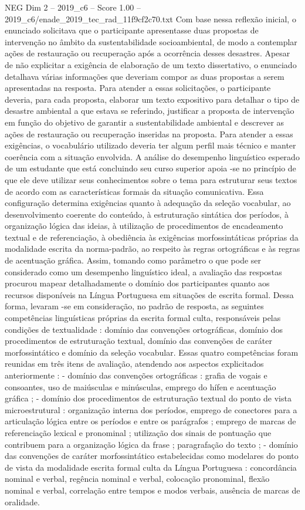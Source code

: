 \begin{textsample}{NEG Dim 2 – 2019\_c6 – Score 1.00 – 2019\_c6/enade\_2019\_tec\_rad\_11f9cf2c70.txt}
Com base nessa reflexão inicial, o enunciado solicitava que o participante apresentasse duas propostas de intervenção no âmbito da sustentabilidade socioambiental, de modo a contemplar ações de restauração ou recuperação após a ocorrência desses desastres.
Apesar de não explicitar a exigência de elaboração de um texto dissertativo, o enunciado detalhava várias informações que deveriam compor as duas propostas a serem apresentadas na resposta.
Para atender a essas solicitações, o participante deveria, para cada proposta, elaborar um texto expositivo para detalhar o tipo de desastre ambiental a que estava se referindo, justificar a proposta de intervenção em função do objetivo de garantir a sustentabilidade ambiental e descrever as ações de restauração ou recuperação inseridas na proposta.
Para atender a essas exigências, o vocabulário utilizado deveria ter algum perfil mais técnico e manter coerência com a situação envolvida.
A análise do desempenho linguístico esperado de um estudante que está concluindo seu curso superior apoia -se no princípio de que ele deve utilizar seus conhecimentos sobre o tema para estruturar seus textos de acordo com as características formais da situação comunicativa.
Essa configuração determina exigências quanto à adequação da seleção vocabular, ao desenvolvimento coerente do conteúdo, à estruturação sintática dos períodos, à organização lógica das ideias, à utilização de procedimentos de encadeamento textual e de referenciação, à obediência às exigências morfossintáticas próprias da modalidade escrita da norma-padrão, ao respeito às regras ortográficas e às regras de acentuação gráfica.
Assim, tomando como parâmetro o que pode ser considerado como um desempenho linguístico ideal, a avaliação das respostas procurou mapear detalhadamente o domínio dos participantes quanto aos recursos disponíveis na Língua Portuguesa em situações de escrita formal.
Dessa forma, levaram -se em consideração, no padrão de resposta, as seguintes competências linguísticas próprias da escrita formal culta, responsáveis pelas condições de textualidade : domínio das convenções ortográficas, domínio dos procedimentos de estruturação textual, domínio das convenções de caráter morfossintático e domínio da seleção vocabular.
Essas quatro competências foram reunidas em três itens de avaliação, atendendo aos aspectos explicitados anteriormente : - domínio das convenções ortográficas : grafia de vogais e consoantes, uso de maiúsculas e minúsculas, emprego do hífen e acentuação gráfica ; - domínio dos procedimentos de estruturação textual do ponto de vista microestrutural : organização interna dos períodos, emprego de conectores para a articulação lógica entre os períodos e entre os parágrafos ; emprego de marcas de referenciação lexical e pronominal ; utilização dos sinais de pontuação que contribuem para a organização lógica da frase ; paragrafação do texto ; - domínio das convenções de caráter morfossintático estabelecidas como modelares do ponto de vista da modalidade escrita formal culta da Língua Portuguesa : concordância nominal e verbal, regência nominal e verbal, colocação pronominal, flexão nominal e verbal, correlação entre tempos e modos verbais, ausência de marcas de oralidade.

\end{textsample}
